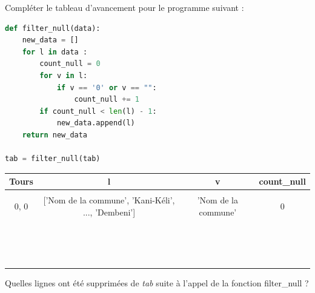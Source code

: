 \begin{Exercise}[title={Filtrer les données manquantes}]

\Question Compléter le tableau d’avancement pour le programme suivant :
\begin{lstlisting}[style=Pythonstyle, language=Python]
def filter_null(data):
    new_data = []
    for l in data :
        count_null = 0
        for v in l:
            if v == '0' or v == "":
                count_null += 1
        if count_null < len(l) - 1:
            new_data.append(l)
    return new_data

tab = filter_null(tab)
\end{lstlisting}

\begin{center}
\begin{tabular}{c|c|c|c}
\textbf{Tours} & \textbf{l} & \textbf{v} & \textbf{count\_null} \\
\hline
& &  & \\
0, 0  &  ['Nom de la commune', 'Kani-Kéli', ..., 'Dembeni'] & 'Nom de la commune'  &   0          \\
      &   &   &             \\
      &   &   &             \\      &   &   &             \\      &   &   &             \\      &   &   &             \\      &   &   &             \\      &   &   &             \\      &   &   &             \\      &   &   &             \\      &   &   &             \\      &   &   &             \\      &   &   &             \\      &   &   &             \\      &   &   &             \\      &   &   &             \\      
\end{tabular}
\end{center}

\Question Quelles lignes ont été supprimées de \textit{tab} suite à l'appel de la fonction filter\_null ?\\
\emptybox{2cm}
\end{Exercise}


